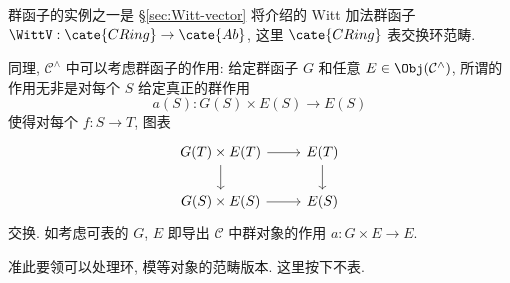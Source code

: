 群函子的实例之一是 \S\ref{sec:Witt-vector} 将介绍的 Witt 加法群函子 $\WittV: \cate{CRing} \to \cate{Ab}$, 这里 $\cate{CRing}$ 表交换环范畴.

\begin{remark}
	同理, $\mathcal{C}^\wedge$ 中可以考虑群函子的作用: 给定群函子 $G$ 和任意 $E \in \Obj(\mathcal{C}^\wedge)$, 所谓的作用无非是对每个 $S$ 给定真正的群作用
	\[ a(S): G(S) \times E(S) \to E(S) \]
	使得对每个 $f: S \to T$, 图表
	\[ \begin{tikzcd}
		G(T) \times E(T) \arrow[d] \arrow[r] & E(T) \arrow[d] \\
		G(S) \times E(S) \arrow[r] & E(S)
	\end{tikzcd} \]
	交换. 如考虑可表的 $G$, $E$ 即导出 $\mathcal{C}$ 中群对象的作用 $a: G \times E \to E$.
\end{remark}
准此要领可以处理环, 模等对象的范畴版本. 这里按下不表.

